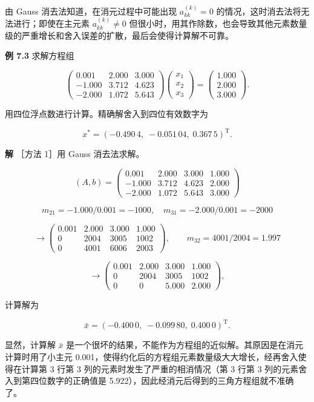 由 Gauss 消去法知道，在消元过程中可能出现 \(a_{kk}^{(k)}=0\) 的情况，这时消去法将无法进行；即使在主元素 \(a_{kk}^{(k)}\ne0\) 但很小时，用其作除数，也会导致其他元素数量级的严重增长和舍入误差的扩散，最后会使得计算解不可靠。

\textbf{例 7.3} 求解方程组

\[
\begin{pmatrix}
0.001&2.000&3.000\\
-1.000&3.712&4.623\\
-2.000&1.072&5.643
\end{pmatrix}
\begin{pmatrix}x_1\\x_2\\x_3\end{pmatrix}
=\begin{pmatrix}1.000\\2.000\\3.000\end{pmatrix}.
\]

用四位浮点数进行计算。精确解舍入到四位有效数字为

\[x^*=(-0.490\,4,\;-0.051\,04,\;0.367\,5)^{\mathrm T}.\]

\textbf{解} ［方法 1］用 Gauss 消去法求解。

\[
(A,b)=\left(\begin{array}{rrr|r}
0.001&2.000&3.000&1.000\\
-1.000&3.712&4.623&2.000\\
-2.000&1.072&5.643&3.000
\end{array}\right)
\]

\[m_{21}=-1.000/0.001=-1000,\quad m_{31}=-2.000/0.001=-2000\]

\[
\longrightarrow\left(\begin{array}{rrr|r}
0.001&2.000&3.000&1.000\\
0&2004&3005&1002\\
0&4001&6006&2003
\end{array}\right),\qquad m_{32}=4001/2004=1.997
\]

\[
\longrightarrow\left(\begin{array}{rrr|r}
0.001&2.000&3.000&1.000\\
0&2004&3005&1002\\
0&0&5.000&2.000
\end{array}\right),
\]

计算解为

\[\bar{x}=(-0.400\,0,\;-0.099\,80,\;0.400\,0)^{\mathrm T}.\]

显然，计算解 \(\bar{x}\) 是一个很坏的结果，不能作为方程组的近似解。其原因是在消元计算时用了小主元 0.001，使得约化后的方程组元素数量级大大增长，经再舍入使得在计算第 3 行第 3 列的元素时发生了严重的相消情况（第 3 行第 3 列的元素舍入到第四位数字的正确值是 5.922），因此经消元后得到的三角方程组就不准确了。

